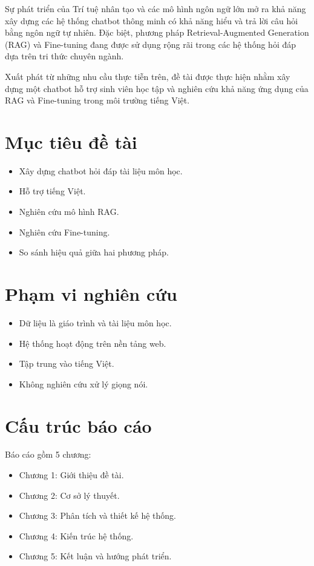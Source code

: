 \documentclass[12pt,a4paper]{report}
\begin{document}
	Sự phát triển của Trí tuệ nhân tạo và các mô hình ngôn ngữ lớn mở ra khả năng xây dựng các hệ thống chatbot thông minh có khả năng hiểu và trả lời câu hỏi bằng ngôn ngữ tự nhiên. Đặc biệt, phương pháp Retrieval-Augmented Generation (RAG) và Fine-tuning đang được sử dụng rộng rãi trong các hệ thống hỏi đáp dựa trên tri thức chuyên ngành.
	
	Xuất phát từ những nhu cầu thực tiễn trên, đề tài được thực hiện nhằm xây dựng một chatbot hỗ trợ sinh viên học tập và nghiên cứu khả năng ứng dụng của RAG và Fine-tuning trong môi trường tiếng Việt.
	
	\section{Mục tiêu đề tài}
	
	\begin{itemize}
		\item Xây dựng chatbot hỏi đáp tài liệu môn học.
		\item Hỗ trợ tiếng Việt.
		\item Nghiên cứu mô hình RAG.
		\item Nghiên cứu Fine-tuning.
		\item So sánh hiệu quả giữa hai phương pháp.
	\end{itemize}
	
	\section{Phạm vi nghiên cứu}
	
	\begin{itemize}
		\item Dữ liệu là giáo trình và tài liệu môn học.
		\item Hệ thống hoạt động trên nền tảng web.
		\item Tập trung vào tiếng Việt.
		\item Không nghiên cứu xử lý giọng nói.
	\end{itemize}
	
	\section{Cấu trúc báo cáo}
	
	Báo cáo gồm 5 chương:
	
	\begin{itemize}
		\item Chương 1: Giới thiệu đề tài.
		\item Chương 2: Cơ sở lý thuyết.
		\item Chương 3: Phân tích và thiết kế hệ thống.
		\item Chương 4: Kiến trúc hệ thống.
		\item Chương 5: Kết luận và hướng phát triển.
	\end{itemize}
	
\end{document}
